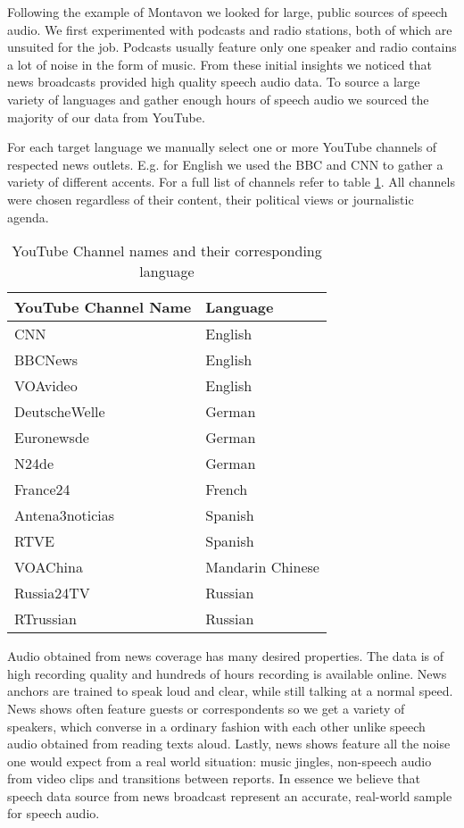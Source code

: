 	Following the example of Montavon \cite{montavon2009deep} we looked for large, public sources of speech audio. We first experimented with podcasts and radio stations, both of which are unsuited for the job. Podcasts usually feature only one speaker and radio contains a lot of noise in the form of music. From these initial insights we noticed that news broadcasts provided high quality speech audio data. To source a large variety of languages and gather enough hours of speech audio we sourced the majority of our data from YouTube. 
	
	For each target language we manually select one or more YouTube channels of respected news outlets. E.g. for English we used the BBC and CNN to gather a variety of different accents. For a full list of channels refer to table \ref{tab:channels}. All channels were chosen regardless of their content, their political views or journalistic agenda.
	
	\begin{table}[]
	\centering
	\begin{tabular}{@{}ll@{}}
	\toprule
	YouTube Channel Name  & Language \\ \midrule
	CNN                   & English \\
	BBCNews               & English \\
	VOAvideo              & English \\
	DeutscheWelle         & German \\
	Euronewsde            & German \\
	N24de                 & German \\
	France24              & French \\
	Antena3noticias       & Spanish \\
	RTVE                  & Spanish \\
	VOAChina              & Mandarin Chinese  \\
	Russia24TV            & Russian \\
	RTrussian             & Russian \\ \bottomrule
	\end{tabular}
	\label{tab:channels}
	\caption{YouTube Channel names and their corresponding language}
	\end{table}

  	
  	Audio obtained from news coverage has many desired properties. The data is of high recording quality and hundreds of hours recording is available online. News anchors are trained to speak loud and clear, while still talking at a normal speed. News shows often feature guests or correspondents so we get a variety of speakers, which converse in a ordinary fashion with each other unlike speech audio obtained from reading texts aloud. Lastly, news shows feature all the noise one would expect from a real world situation: music jingles, non-speech audio from video clips and transitions between reports. In essence we believe that speech data source from news broadcast represent an accurate, real-world sample for speech audio.
  	
